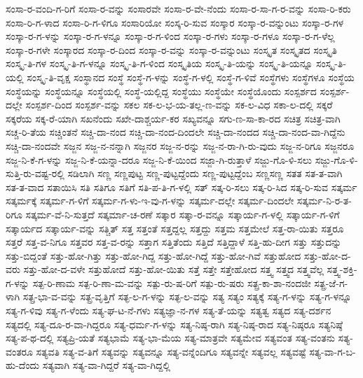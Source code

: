 {ಸಂಸಾ-ರ-ವಂದಿ-ಗ-ರಿಗೆ
ಸಂಸಾ-ರ-ವನ್ನು
ಸಂಸಾರವೇ
ಸಂಸಾ-ರ-ವೇ-ನೆಂದು
ಸಂಸಾ-ರ-ಸಾ-ಗ-ರ-ವನ್ನು
ಸಂಸಾ-ರಿ-ಕರು
ಸಂಸಾ-ರಿ-ಗ-ಳಾದ
ಸಂಸಾ-ರಿ-ಗ-ಳಿಗೂ
ಸಂಸಾರಿಯೋ
ಸಂಸ್ಕ-ರಿ-ಸುವ
ಸಂಸ್ಕಾರ
ಸಂಸ್ಕಾ-ರ-ವನ್ನುಂಟು
ಸಂಸ್ಕಾ-ರ-ಗಳ
ಸಂಸ್ಕಾ-ರ-ಗ-ಳನ್ನು
ಸಂಸ್ಕಾ-ರ-ಗ-ಳನ್ನೂ
ಸಂಸ್ಕಾ-ರ-ಗ-ಳಿಂದ
ಸಂಸ್ಕಾ-ರ-ಗಳು
ಸಂಸ್ಕಾ-ರ-ಗಳೂ
ಸಂಸ್ಕಾ-ರ-ಗ-ಳೆಲ್ಲ
ಸಂಸ್ಕಾ-ರ-ಗಳೇ
ಸಂಸ್ಕಾರದ
ಸಂಸ್ಕಾ-ರ-ದಿಂದ
ಸಂಸ್ಕಾ-ರ-ವನ್ನು
ಸಂಸ್ಕಾ-ರ-ವನ್ನುಂಟು
ಸಂಸ್ಕೃತ
ಸಂಸ್ಕೃತದ
ಸಂಸ್ಕೃತಿ
ಸಂಸ್ಕೃ-ತಿ-ಗಳ
ಸಂಸ್ಕೃ-ತಿ-ಗ-ಳನ್ನೂ
ಸಂಸ್ಕೃ-ತಿ-ಗ-ಳಿಂದ
ಸಂಸ್ಕೃತಿಯ
ಸಂಸ್ಕೃ-ತಿ-ಯನ್ನು
ಸಂಸ್ಕೃ-ತಿ-ಯನ್ನೂ
ಸಂಸ್ಕೃ-ತಿ-ಯಲ್ಲಿ
ಸಂಸ್ಕೃ-ತಿ-ವೃಕ್ಷ
ಸಂಸ್ಥಾನದ
ಸಂಸ್ಥೆ
ಸಂಸ್ಥೆ-ಗ-ಳನ್ನು
ಸಂಸ್ಥೆ-ಗ-ಳಲ್ಲಿ
ಸಂಸ್ಥೆ-ಗ-ಳಿವೆ
ಸಂಸ್ಥೆಗಳು
ಸಂಸ್ಥೆಗಳೂ
ಸಂಸ್ಥೆಯ
ಸಂಸ್ಥೆಯನ್ನು
ಸಂಸ್ಥೆಯನ್ನೂ
ಸಂಸ್ಥೆಯಲ್ಲಿ
ಸಂಸ್ಥೆ-ಯಲ್ಲಿದ್ದ
ಸಂಸ್ಥೆಯು
ಸಂಸ್ಥೆಯೇ
ಸಂಸ್ಥೆಯೊಂದು
ಸಂಸ್ಪರ್ಶದ
ಸಂಸ್ಪರ್ಶ-ದಲ್ಲೇ
ಸಂಸ್ಪರ್ಶ-ದಿಂದ
ಸಂಸ್ಪರ್ಶ-ವನ್ನು
ಸಕಲ
ಸಕ-ಲ-ಭ-ಯ-ತಲ್ಲ-ಣ-ವನ್ನು
ಸಕ-ಲ-ವಿಧ
ಸಕಾ-ಲ-ದಲ್ಲಿ
ಸಕ್ಕರೆ
ಸಕ್ಕರೆಯ
ಸಕ್ಕ-ರೆ-ಯಾಗಿ
ಸಖನೆಂದು
ಸಖೇ-ದಾಶ್ಚರ್ಯ-ಕರ
ಸಖ್ಯವನ್ನೂ
ಸಗು-ಣ-ಸಾ-ಕಾ-ರದ
ಸಚಿತ್ರ
ಸಚಿತ್ರ-ವಾಗಿ
ಸಚ್ಚ-ರಿ-ತೆಯ
ಸಚ್ಚಿಂತನೆ
ಸಚ್ಚಿ-ದಾ-ನಂದ
ಸಚ್ಚಿ-ದಾ-ನಂದ-ದಿಂದಲೇ
ಸಚ್ಚಿ-ದಾ-ನಂದದ
ಸಚ್ಚಿ-ದಾ-ನಂದ-ವಾ-ಗಿದ್ದೆನು
ಸಚ್ಚಿ-ದಾ-ನಂದವೇ
ಸಜ್ಜನ
ಸಜ್ಜ-ನ-ನನ್ನಾಗಿ
ಸಜ್ಜನರ
ಸಜ್ಜ-ನ-ರನ್ನು
ಸಜ್ಜ-ನ-ರಾ-ಗಿ-ರು-ವುದು
ಸಜ್ಜ-ನ-ರಿಗೂ
ಸಜ್ಜನರೂ
ಸಜ್ಜ-ನಿ-ಕೆ-ಗ-ಳನ್ನು
ಸಜ್ಜ-ನಿ-ಕೆ-ಯನ್ನಾ-ದರೂ
ಸಜ್ಜ-ನಿ-ಕೆ-ಯಿಂದ
ಸಜ್ಜಾ-ಗಿ-ರುತ್ತಾಳೆ
ಸಜ್ಜು-ಗೊ-ಳಿ-ಸಲು
ಸಜ್ಜು-ಗೊ-ಳಿ-ಸುತ್ತಿ-ರು-ವಷ್ಟ-ರಲ್ಲಿ
ಸಡಿಲಾಗಿ
ಸಣ್ಣ
ಸಣ್ಣಪುಟ್ಟ
ಸಣ್ಣ-ಪುಟ್ಟದ್ದೆಂದು
ಸಣ್ಣ-ಪುಟ್ಟದ್ದೆಂಬ
ಸಣ್ಣಸಣ್ಣ
ಸತತ
ಸತ-ತ-ವಾಗಿ
ಸತ-ತ-ವಾದ
ಸತಾಯಿಸಿ
ಸತಿ
ಸತಿಗೂ
ಸತಿಗೆ
ಸತಿ-ಪ-ತಿ-ಗ-ಳಲ್ಲಿ
ಸತ್
ಸತ್ಕ-ರಿ-ಸಲು
ಸತ್ಕ-ರಿ-ಸಿದ
ಸತ್ಕ-ರಿ-ಸುವ
ಸತ್ಕರ್ಮ
ಸತ್ಕರ್ಮಕ್ಕೆ
ಸತ್ಕರ್ಮ-ಗ-ಳಿಗೆ
ಸತ್ಕರ್ಮ-ಗ-ಳು-ಇ-ವು-ಗ-ಳನ್ನು
ಸತ್ಕರ್ಮ-ದಲ್ಲೇ
ಸತ್ಕರ್ಮ-ದಿಂದಲೇ
ಸತ್ಕರ್ಮ-ನಿ-ರ-ತ-ರಿಗೂ
ಸತ್ಕರ್ಮ-ವೆ-ನಿ-ಸುತ್ತದೆ
ಸತ್ಕರ್ಮಾ-ಚ-ರಣೆ
ಸತ್ಕಾರ
ಸತ್ಕಾ-ರ-ವನ್ನೂ
ಸತ್ಕಾರ್ಯ-ಗ-ಳಲ್ಲಿ
ಸತ್ಕಾರ್ಯ-ಗ-ಳಿಗೆ
ಸತ್ಕಾರ್ಯದ
ಸತ್ಕಾರ್ಯ-ವನ್ನು
ಸತ್ಚಿತ್
ಸತ್ತ
ಸತ್ತಂತೆ
ಸತ್ತದ್ದಲ್ಲ
ಸತ್ತದ್ದು
ಸತ್ತಮ
ಸತ್ತಮೇಲೆ
ಸತ್ತ-ರಾ-ಯಿತು
ಸತ್ತರೂ
ಸತ್ತರೆ
ಸತ್ತ-ವ-ನಿಗೂ
ಸತ್ತವರ
ಸತ್ತ-ವ-ರನ್ನು
ಸತ್ತಾಗ
ಸತ್ತಿತೆಂದು
ಸತ್ತಿದೆ
ಸತ್ತಿದ್ದಾಳೆ
ಸತ್ತಿ-ಹು-ದೀಗ
ಸತ್ತು
ಸತ್ತುದನ್ನು
ಸತ್ತು-ಬಿದ್ದಂತೆ
ಸತ್ತು-ಹೋ-ಗಿತ್ತು
ಸತ್ತು-ಹೋ-ಗಿದ್ದ
ಸತ್ತು-ಹೋ-ಗಿದ್ದೆ
ಸತ್ತು-ಹೋ-ಗಿವೆ
ಸತ್ತುಹೋದ
ಸತ್ತು-ಹೋ-ದ-ವರು
ಸತ್ತು-ಹೋ-ದ-ವಳೇ
ಸತ್ತುಹೋದೆ
ಸತ್ತು-ಹೋ-ಯಿತು
ಸತ್ತೆ
ಸತ್ತೇ
ಸತ್ತೇಹೋದ
ಸತ್ತ್ವ
ಸತ್ತ್ವದ
ಸತ್ತ್ವವೆಲ್ಲ
ಸತ್ತ್ವ-ಶಕ್ತಿ-ಗ-ಳನ್ನು
ಸತ್ಪ-ರಿ-ಣಾಮ
ಸತ್ಪ-ರಿ-ಣಾ-ಮ-ವನ್ನು
ಸತ್ಪು-ರು-ಷ-ರಿಗೆ
ಸತ್ಪು-ರು-ಷರು
ಸತ್ಪ್ರ-ಕಾ-ಶಾ-ನಂದಜೀ
ಸತ್ಪ್ರ-ಜೆ-ಗ-ಳಾಗಿ
ಸತ್ಪ್ರ-ಭಾ-ವ-ವನ್ನು
ಸತ್ಪ್ರ-ವೃತ್ತಿಗೆ
ಸತ್ಫ-ಲ-ಗ-ಳನ್ನು
ಸತ್ಫ-ಲ-ವನ್ನು
ಸತ್ಯ
ಸತ್ಯಂ
ಸತ್ಯಕ್ಕೆ
ಸತ್ಯ-ಗ-ಳನ್ನು
ಸತ್ಯ-ಗ-ಳನ್ನೂ
ಸತ್ಯ-ಗ-ಳಿವು
ಸತ್ಯ-ಗ-ಳೆಂದು
ಸತ್ಯ-ಘ-ಟ-ನೆ-ಗಳು
ಸತ್ಯಜ್ಞಾ-ನ-ಗಳ
ಸತ್ಯ-ತೆ-ಯನ್ನು
ಸತ್ಯತ್ವ
ಸತ್ಯದ
ಸತ್ಯ-ದರ್ಶನ
ಸತ್ಯದಲ್ಲಿ
ಸತ್ಯ-ದೂ-ರ-ವಾ-ಗಿದ್ದರೂ
ಸತ್ಯ-ಧರ್ಮ-ಗ-ಳನ್ನು
ಸತ್ಯ-ನಿಷ್ಠ-ರಾಗಿ
ಸತ್ಯ-ನಿಷ್ಠ-ರಾದ
ಸತ್ಯ-ನಿಷ್ಠರೂ
ಸತ್ಯನಿಷ್ಠೆ
ಸತ್ಯ-ಪ-ಥ-ದಲ್ಲಿ
ಸತ್ಯಪ್ರಿ-ಯತೆ
ಸತ್ಯಭಾಮೆ
ಸತ್ಯ-ಭಾ-ಮೆಯ
ಸತ್ಯ-ಮಾತ್ರವೇ
ಸತ್ಯಮೇವ
ಸತ್ಯವಂತ
ಸತ್ಯ-ವಂತನು
ಸತ್ಯ-ವಂತರೂ
ಸತ್ಯವತಿ
ಸತ್ಯ-ವ-ತಿಗೆ
ಸತ್ಯವನ್ನು
ಸತ್ಯವನ್ನೂ
ಸತ್ಯ-ವನ್ನೆಂದಿಗೂ
ಸತ್ಯವನ್ನೇ
ಸತ್ಯವಲ್ಲ
ಸತ್ಯವಷ್ಟೆ
ಸತ್ಯ-ವಾ-ಗ-ಬ-ಹು-ದೆಂದು
ಸತ್ಯವಾಗಿ
ಸತ್ಯ-ವಾ-ಗಿದ್ದರೆ
ಸತ್ಯ-ವಾ-ಗಿದ್ದಲ್ಲಿ
}
